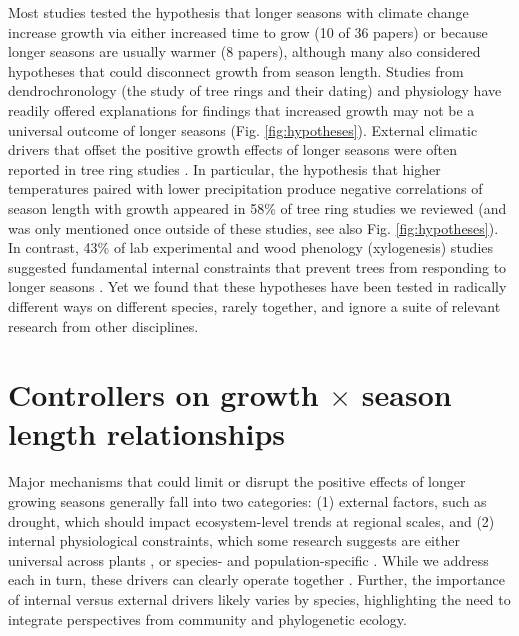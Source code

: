 \documentclass[11pt]{article}
\newcommand{\R}[1]{\label{#1}\linelabel{#1}}
\begin{document}
Most studies tested the hypothesis that longer seasons with climate change increase growth via either increased time to grow (10 of 36 papers) or because longer seasons are usually warmer (8 papers), although many also considered hypotheses that could disconnect growth from season length. Studies from dendrochronology (the study of tree rings and their dating) and physiology have readily offered explanations for findings that increased growth may not be a universal outcome of longer seasons (Fig. \ref{fig:hypotheses}). External climatic drivers that offset the positive growth effects of longer seasons were often reported in tree ring studies \citep{kolavr2016response,de2022temperature,camarero2022decoupled}. In particular, the hypothesis that higher temperatures paired with lower precipitation produce negative correlations of season length with growth appeared in 58\% of tree ring studies we reviewed (and was only mentioned once outside of these studies, see also Fig. \ref{fig:hypotheses}). In contrast, 43\% of lab experimental and wood phenology (xylogenesis) studies suggested fundamental internal constraints that prevent trees from responding to longer seasons \citep[Fig. \ref{fig:heatmapssupp},][]{cuny2012life,michelot2012comparing,zohner2023effect}. Yet we found that these hypotheses have been tested in radically different ways on different species, rarely together, and ignore a suite of relevant research from other disciplines. %
 
\section*{Controllers on growth $\times$ season length relationships}

Major mechanisms that could limit or disrupt the positive effects of longer growing seasons generally fall into two categories: (1) external factors, such as drought, which should impact ecosystem-level trends at regional scales, and (2) internal physiological constraints, which some research suggests are either universal across plants \citep[e.g.][]{zohner2023effect}, or species- and population-specific \citep[e.g.][]{soolanayakanahally2013timing}. While we address each in turn, these drivers can clearly operate together \citep{korner2015paradigm}\R{forbigK}. Further, the importance of internal versus external drivers likely varies by species, highlighting the need to integrate perspectives from community and phylogenetic ecology. 
\end{document}

